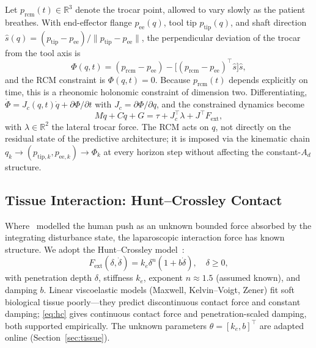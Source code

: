 Let $p_{\text{rcm}}(t) \in \mathbb{R}^3$ denote the trocar point, allowed to vary slowly as the patient breathes. With end-effector flange $p_{\text{ee}}(q)$, tool tip $p_{\text{tip}}(q)$, and shaft direction $\hat{s}(q) = (p_{\text{tip}} - p_{\text{ee}})/\|p_{\text{tip}} - p_{\text{ee}}\|$, the perpendicular deviation of the trocar from the tool axis is
\begin{equation}
\Phi(q,t) = (p_{\text{rcm}} - p_{\text{ee}}) - \big[ (p_{\text{rcm}} - p_{\text{ee}})^\top \hat{s} \big] \hat{s},
\label{eq:rcm}
\end{equation}
and the RCM constraint is $\Phi(q,t) = 0$. Because $p_{\text{rcm}}(t)$ depends explicitly on time, this is a rheonomic holonomic constraint of dimension two. Differentiating, $\dot{\Phi} = J_c(q,t)\dot{q} + \partial\Phi/\partial t$ with $J_c = \partial\Phi/\partial q$, and the constrained dynamics become
\begin{equation}
M\ddot{q} + C\dot{q} + G = \tau + J_c^\top \lambda + J^\top F_{\text{ext}},
\label{eq:constrained}
\end{equation}
with $\lambda \in \mathbb{R}^2$ the lateral trocar force. The RCM acts on $q$, not directly on the residual state of the predictive architecture; it is imposed via the kinematic chain $q_k \to (p_{\text{tip},k}, p_{\text{ee},k}) \to \Phi_k$ at every horizon step without affecting the constant-$A_d$ structure.

\subsection{Tissue Interaction: Hunt--Crossley Contact}

Where~\cite{cao2026phri} modelled the human push as an unknown bounded force absorbed by the integrating disturbance state, the laparoscopic interaction force has known structure. We adopt the Hunt--Crossley model~\cite{hunt1975,diolaiti2005}:
\begin{equation}
F_{\text{ext}}(\delta, \dot{\delta}) = k_e \delta^n (1 + b\dot{\delta}), \quad \delta \ge 0,
\label{eq:hc}
\end{equation}
with penetration depth $\delta$, stiffness $k_e$, exponent $n \approx 1.5$ (assumed known), and damping $b$. Linear viscoelastic models (Maxwell, Kelvin--Voigt, Zener) fit soft biological tissue poorly---they predict discontinuous contact force and constant damping; \eqref{eq:hc} gives continuous contact force and penetration-scaled damping, both supported empirically. The unknown parameters $\theta = [k_e, b]^\top$ are adapted online (Section~\ref{sec:tissue}).

